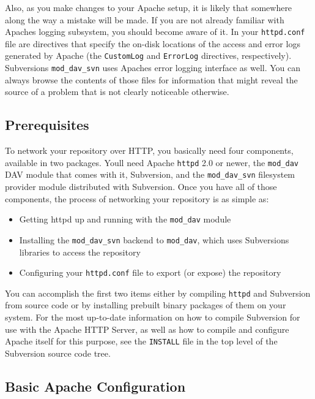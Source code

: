 Also, as you make changes to your Apache setup, it is likely that
somewhere along the way a mistake will be made. If you are not already
familiar with Apache\textquotesingle s logging subsystem, you should
become aware of it. In your \texttt{httpd.conf} file are directives that
specify the on-disk locations of the access and error logs generated by
Apache (the \texttt{CustomLog} and \texttt{ErrorLog} directives,
respectively). Subversion\textquotesingle s \texttt{mod\_dav\_svn} uses
Apache\textquotesingle s error logging interface as well. You can always
browse the contents of those files for information that might reveal the
source of a problem that is not clearly noticeable otherwise.

\subsection{Prerequisites}\label{svn.serverconfig.httpd.prereqs}

To network your repository over HTTP, you basically need four
components, available in two packages. You\textquotesingle ll need
Apache \texttt{httpd} 2.0 or newer, the \texttt{mod\_dav} DAV module
that comes with it, Subversion, and the \texttt{mod\_dav\_svn}
filesystem provider module distributed with Subversion. Once you have
all of those components, the process of networking your repository is as
simple as:

\begin{itemize}
\item
  Getting httpd up and running with the \texttt{mod\_dav} module
\item
  Installing the \texttt{mod\_dav\_svn} backend to \texttt{mod\_dav},
  which uses Subversion\textquotesingle s libraries to access the
  repository
\item
  Configuring your \texttt{httpd.conf} file to export (or expose) the
  repository
\end{itemize}

You can accomplish the first two items either by compiling
\texttt{httpd} and Subversion from source code or by installing prebuilt
binary packages of them on your system. For the most up-to-date
information on how to compile Subversion for use with the Apache HTTP
Server, as well as how to compile and configure Apache itself for this
purpose, see the \texttt{INSTALL} file in the top level of the
Subversion source code tree.

\subsection{Basic Apache
Configuration}\label{svn.serverconfig.httpd.basic}

